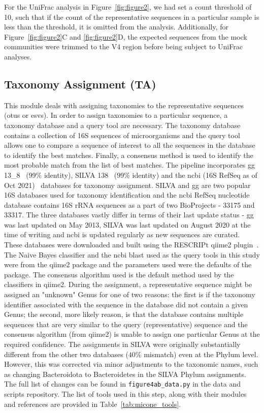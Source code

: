 \documentclass[letterpaper,12pt]{article}
\begin{document}
  For the UniFrac analysis in Figure~\ref{fig:figure2}, we had set a count threshold of 10, such that if the count of the representative sequences in a particular sample is less than the threshold, it is omitted from the analysis.
  Additionally, for Figure~\ref{fig:figure2}C and \ref{fig:figure2}D, the expected sequences from the mock communities were trimmed to the V4 region before being subject to UniFrac analyses.

  \subsection*{Taxonomy Assignment (TA)}
  \vspace{-5mm}
  This module deals with assigning taxonomies to the representative sequences (\ac{otu}s or \ac{esv}s).
  In order to assign taxonomies to a particular sequence, a taxonomy database and a query tool are necessary.
  The taxonomy database contains a collection of 16S sequences of microorganisms and the query tool allows one to compare a sequence of interest to all the sequences in the database to identify the best matches.
  Finally, a consensus method is used to identify the most probable match from the list of best matches.
  The pipeline incorporates \ac{gg} 13\_8~\cite{DeSantis2006} (99\% identity), SILVA 138~\cite{Quast2012} (99\% identity) and the \ac{ncbi} (16S RefSeq as of Oct 2021)~\cite{Sayers2009} databases for taxonomy assignment.
  SILVA and \ac{gg} are two popular 16S databases used for taxonomy identification and the \ac{ncbi} RefSeq nucleotide database contains 16S rRNA sequences as a part of two BioProjects - 33175 and 33317.
  The three databases vastly differ in terms of their last update status - \ac{gg} was last updated on May 2013, SILVA was last updated on August 2020 at the time of writing and \ac{ncbi} is updated regularly as new sequences are curated.
  These databases were downloaded and built using the RESCRIPt \ac{qiime2} plugin~\cite{iiRESCRIPtReproducibleSequence2021}.
  The Naive Bayes classifier and the \ac{ncbi} blast used as the query tools in this study were from the \ac{qiime2} package and the parameters used were the defaults of the package.
  The consensus algorithm used is the default method used by the classifiers in \ac{qiime2}.
  During the assignment, a representative sequence might be assigned an "unknown" Genus for one of two reasons: the first is if the taxonomy identifier associated with the sequence in the database did not contain a given Genus; the second, more likely reason, is that the database contains multiple sequences that are very similar to the query (representative) sequence and the consensus algorithm (from \ac{qiime2}) is unable to assign one particular Genus at the required confidence.
  The assignments in SILVA were originally substantially different from the other two databases ($40\%$ mismatch) even at the Phylum level.
  However, this was corrected via minor adjustments to the taxonomic names, such as changing Bacteroidota to Bacteroidetes in the SILVA Phylum assignments.
  The full list of changes can be found in \texttt{figure4ab\_data.py} in the data and scripts  repository.
  The list of tools used in this step, along with their modules and references are provided in Table~\ref{tab:micone_tools}.
\end{document}

